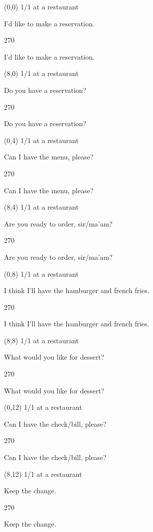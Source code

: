 \documentclass[a4paper]{article}
\newcommand{\mycard}[3]{%
	\small #1 #2
	\par
	\parbox[t][6.8cm][c]{9.5cm}{%
	\par
	\myleft{#3}
	\par
	\myright{#3}
	}
}
\newcommand{\myleft}[1]{%
	\begin{sideways}
	\hspace*{-4.2cm}
		\parbox[t][2.5cm][c]{4.7cm}{%
		\Large #1
		}
	\end{sideways}
}
\newcommand{\myright}[1]{%
	\hspace*{7.1cm}
	\begin{turn}{270}
	\hspace*{-0.9cm}
		\parbox[t][2.5cm][c]{4.7cm}{%
		\Large #1
		}
	\end{turn}
}
\begin{document}
\begin{textblock}{8}(0,0)
\mycard{1/1}{at a restaurant}{
I'd like to make a reservation.
}
\end{textblock}

\begin{textblock}{8}(8,0)
\mycard{1/1}{at a restaurant}{
Do you have a reservation?
}
\end{textblock}

\begin{textblock}{8}(0,4)
\mycard{1/1}{at a restaurant}{
Can I have the menu, please?
}
\end{textblock}

\begin{textblock}{8}(8,4)
\mycard{1/1}{at a restaurant}{
Are you ready to order, sir/ma'am?
}
\end{textblock}

\begin{textblock}{8}(0,8)
\mycard{1/1}{at a restaurant}{
I think I'll have the hamburger and french fries.
}
\end{textblock}

\begin{textblock}{8}(8,8)
\mycard{1/1}{at a restaurant}{
What would you like for dessert?
}
\end{textblock}

\begin{textblock}{8}(0,12)
\mycard{1/1}{at a restaurant}{
Can I have the check/bill, please?
}
\end{textblock}

\begin{textblock}{8}(8,12)
\mycard{1/1}{at a restaurant}{
Keep the change.
}
\end{textblock}

\null
\newpage
\end{document}
